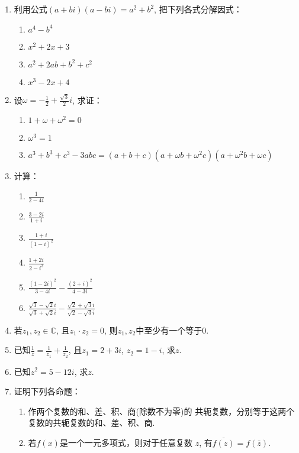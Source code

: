 \begin{enumerate}
\item 利用公式$(a+bi)(a-bi)=a^2+b^2$, 把下列各式分解因式：
\begin{multicols}{2}
 \begin{enumerate}[(1)]
    \item $a^{4}-b^{4}$
    \item $x^{2}+2x+3$
    \item $a^{2}+2ab+b^{2}+c^{2}$
    \item $x^{3}-2x+4$
\end{enumerate}   
\end{multicols}


\item 设$\omega = - \frac 12+ \frac {\sqrt {3}}2i$, 求证：
\begin{enumerate}[(1)]
    \item $1+\omega+\omega^{2}=0$
    \item $\omega^{3}=1$
    \item $a^{3}+b^{3}+c^{3}-3abc=(a+b+c)(a+\omega b+\omega^{2}c)(a+\omega^{2}b+\omega c)$
\end{enumerate}
\item 计算：
\begin{multicols}{2}
\begin{enumerate}[(1)]
    \item $\frac{1}{2-4i}$
    \item $\frac{3-2i}{1+i}$
    \item $\frac{1+i}{(1-i)^{2}}$
    \item $\frac{1+2i}{2-i^3}$
    \item $\frac{(1-2i)^2}{3-4i}-\frac{(2+i)^2}{4-3i}$
    \item $\frac{\sqrt{3}-\sqrt{2}i}{\sqrt{3}+\sqrt{2}i}-\frac{\sqrt{2}+\sqrt{3}i}{\sqrt{2}-\sqrt{3}i}$
\end{enumerate}
\end{multicols}

\item 若$z_1,z_2\in\mathbb{C}$, 且$z_1\cdot z_2=0$, 则$z_1,z_2$中至少有一个等于0.

\item 已知$\frac1z=\frac{1}{z_{1}}+\frac{1}{z_{2}}$, 且$z_1=2+3i$, $z_{2}=1-i$,
求$z$.

\item 已知$z^2=5-12i$, 求$z$.

\item 证明下列各命题：
\begin{enumerate}[(1)]
    \item 作两个复数的和、差、积、商(除数不为零)的
共轭复数，分别等于这两个复数的共轭复数的和、差、积、商.
\item 若$f(x)$是一个一元多项式，则对于任意复数
$z$, 有$\overline{f(z)}=f(\bar{z})$.
\end{enumerate}


\end{enumerate}
